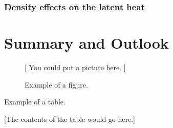 \documentclass[12pt]{report}
\begin{document}
\subsection{Density effects on the latent heat}

\chapter{Summary and Outlook}










\begin{figure}
\centerline{[ You could put a picture here. ]}
\caption{Example of a figure.}
\end{figure}

\begin{table}
\caption{Example of a table.}
\centerline{[The contents of the table would go here.]}
\end{table}



\begin{thebibliography}{99}
        
\end{thebibliography}
\end{document}
